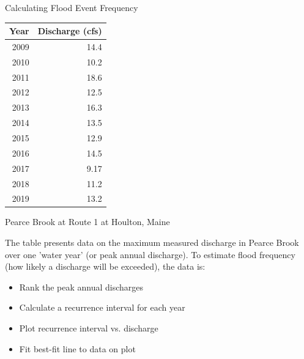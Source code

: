 \documentclass[ignorenonframetext,aspectratio=169]{beamer}
\begin{document}
\begin{frame}{Calculating Flood Event Frequency}
  \begin{minipage}{.5\textwidth}
    \begin{tabular}{r r}
      Year & Discharge (cfs) \\ \hline
      2009 & 14.4            \\
      2010 & 10.2            \\
      2011 & 18.6            \\
      2012 & 12.5            \\
      2013 & 16.3            \\
      2014 & 13.5            \\
      2015 & 12.9            \\
      2016 & 14.5            \\
      2017 & 9.17            \\
      2018 & 11.2            \\
      2019 & 13.2            \\ \hline
    \end{tabular}

    \scriptsize  Pearce Brook at Route 1 at Houlton, Maine
  \end{minipage}
  \begin{minipage}{.48\textwidth}
    \small 
    The table presents data on the maximum measured discharge in Pearce Brook over one 'water year' (or peak annual discharge). To estimate flood frequency (how likely a discharge will be exceeded), the data is:
    \begin{itemize}
    \item Rank the peak annual discharges
    \item Calculate a recurrence interval for each year
    \item Plot recurrence interval vs. discharge
    \item Fit best-fit line to data on plot
    \end{itemize}
  \end{minipage}
\end{frame}
\end{document}
